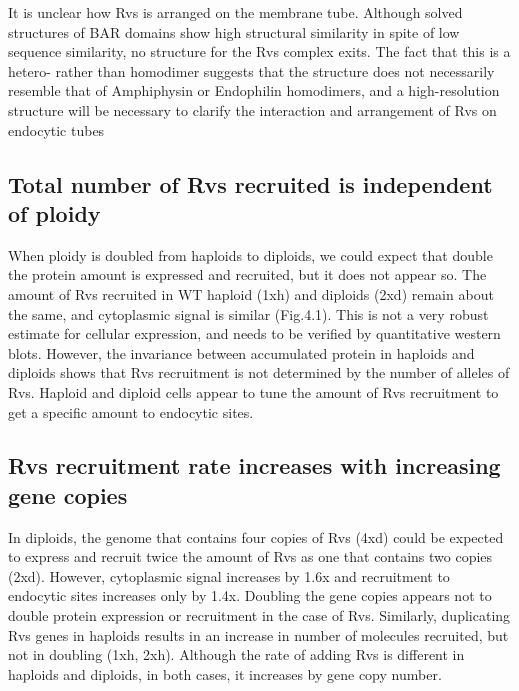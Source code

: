 	\vspace{5mm}
It is unclear how Rvs is arranged on the membrane tube. Although solved structures of BAR domains show high structural similarity in spite of low sequence similarity, no structure for the Rvs complex exits. The fact that this is a hetero- rather than homodimer suggests that the structure does not necessarily resemble that of Amphiphysin or Endophilin homodimers, and a high-resolution structure will be necessary to clarify the interaction and arrangement of Rvs on endocytic tubes

\subsection{Total number of Rvs recruited is independent of ploidy}
When ploidy is doubled from haploids to diploids, we could expect that double the protein amount is expressed and recruited, but it does not appear so. The amount of Rvs recruited in WT haploid (1xh) and diploids (2xd) remain about the same, and cytoplasmic signal is similar (Fig.4.1). This is not a very robust estimate for cellular expression, and needs to be verified by quantitative western blots. However, the invariance between accumulated protein in haploids and diploids shows that Rvs recruitment is not determined by the number of alleles of Rvs. Haploid and diploid cells appear to tune the amount of Rvs recruitment to get a specific amount to endocytic sites.

\subsection{Rvs recruitment rate increases with increasing gene copies}
In diploids, the genome that contains four copies of Rvs (4xd) could be expected to express and recruit twice the amount of Rvs as one that contains two copies (2xd). However, cytoplasmic signal increases by 1.6x and recruitment to endocytic sites increases only by 1.4x. Doubling the gene copies appears not to double protein expression or recruitment in the case of Rvs. Similarly, duplicating Rvs genes in haploids results in an increase in number of molecules recruited, but not in doubling (1xh, 2xh). Although the rate of adding Rvs is different in haploids and diploids, in both cases, it increases by gene copy number. 


